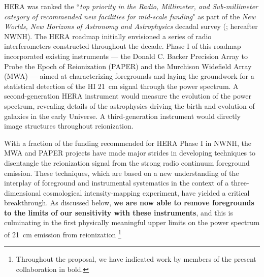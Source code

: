 \documentclass[preprint]{aastex}
\newcommand{\Mycitep}[1]{{\bf \citep{#1}}}
\begin{document}
HERA was ranked the ``{\it top priority in the Radio, Millimeter, and
Sub-millimeter category of recommended new facilities for mid-scale
funding}" as part of the {\it New Worlds, New Horizons of Astronomy
and Astrophysics} decadal survey (\citealt{astro2010}; hereafter
NWNH).  The HERA roadmap initially envisioned a series of radio
interferometers constructed throughout the decade. Phase I of this roadmap
incorporated existing instruments --- the Donald C. Backer Precision Array to Probe the Epoch of
Reionization (PAPER) and the Murchison Widefield Array (MWA) ---
aimed at characterizing foregrounds and laying the
groundwork for a statistical detection of the HI 21~cm signal through
the power spectrum.  A second-generation HERA instrument would measure
the evolution of the power spectrum, revealing details of the astrophysics driving
the birth and evolution of galaxies 
in the early Universe. A third-generation instrument would
directly image structures throughout reionization.

With a fraction of the funding recommended for HERA Phase I
in NWNH, the MWA and PAPER projects have made
major strides in developing techniques to disentangle
the reionization signal from the strong radio continuum foreground
emission.  These techniques, which are based on a new
understanding of the interplay of foreground and instrumental systematics
in the context of a three-dimensional cosmological intensity-mapping experiment,
have yielded a critical breakthrough.  As discussed below, {\bf we are now able to remove 
foregrounds to the limits of our sensitivity with these instruments},
and this is culminating in the first physically meaningful upper limits
on the power spectrum of 21~cm emission from reionization \Mycitep{parsons_et_al2013}\footnote{Throughout the proposal, we have indicated work by members of the present collaboration in bold.}


\end{document}
